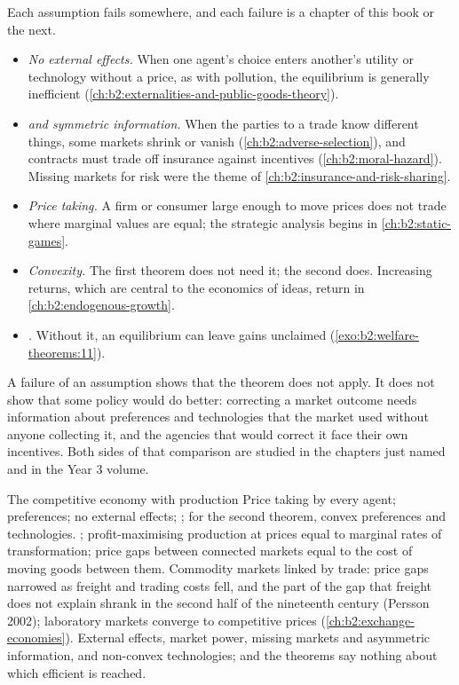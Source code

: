 Each assumption fails somewhere, and each failure is a chapter of this book or the next.
\begin{itemize}
  \item \emph{No external effects.} When one agent's choice enters another's utility or technology
        without a price, as with pollution, the equilibrium is generally inefficient
        (\cref{ch:b2:externalities-and-public-goods-theory}).
  \item \emph{ and symmetric information.} When the parties to a trade know different
        things, some markets shrink or vanish (\cref{ch:b2:adverse-selection}), and contracts must trade off
        insurance against incentives (\cref{ch:b2:moral-hazard}). Missing markets for risk were the theme of
        \cref{ch:b2:insurance-and-risk-sharing}.
  \item \emph{Price taking.} A firm or consumer large enough to move prices does not trade where marginal
        values are equal; the strategic analysis begins in \cref{ch:b2:static-games}.
  \item \emph{Convexity.} The first theorem does not need it; the second does. Increasing returns, which
        are central to the economics of ideas, return in \cref{ch:b2:endogenous-growth}.
  \item \emph{.} Without it, an equilibrium can leave gains unclaimed
        (\cref{exo:b2:welfare-theorems:11}).
\end{itemize}
A failure of an assumption shows that the theorem does not apply. It does not show that some policy would
do better: correcting a market outcome needs information about preferences and technologies that the
market used without anyone collecting it, and the agencies that would correct it face their own
incentives. Both sides of that comparison are studied in the chapters just named and in the Year 3
volume.

\begin{model}{The competitive economy with production}
\assumes Price taking by every agent;  preferences; no external effects; ; for the second theorem, convex preferences and technologies.
\predicts {}; profit-maximising production at prices equal to marginal rates
of transformation; price gaps between connected markets equal to the cost of moving goods between them.
\tested Commodity markets linked by trade: price gaps narrowed as freight and trading costs fell, and
the part of the gap that freight does not explain shrank in the second half of the nineteenth century
(Persson 2002); laboratory markets converge to competitive prices (\cref{ch:b2:exchange-economies}).
\breaks External effects, market power, missing markets and asymmetric information, and non-convex
technologies; and the theorems say nothing about which efficient  is reached.
\end{model}

